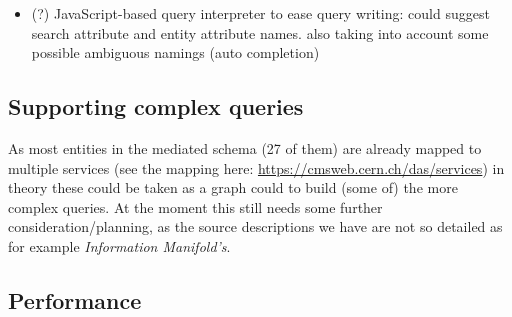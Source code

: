 \begin{itemize}
\begin{itemize}
\item knowing all possible APIs parameter values would be beneficial ({\color{red}but not yet sure if available}%
		\footnote{problem: the owners of services may not want to provide direct access to DB because of no trust, security or performance issues. Otherwise, specific APIs could be developed to return possible parameter values but this is quite an overhead}) and could be used to improve the keyword search (better mapping from keywords to API inputs) or even the structured search (e.g. query cleaning/term auto-completion)
\begin{itemize}
\item having direct access to DB, one could incrementally index target database\footnote{%
			E.g. an inverted index of values in Oracle/MySQL DB tables can be built to keep the list of possible terms. For instance, Sphinx full text search engine can access DBs directly and also supports incremental indexing but it needs a bit of manual configuration {http://sphinxsearch.com/docs/current.html\#delta-updates} }%
	tables mapping it's columns into API parameters (manually or automatically). 

\end{itemize}
	\end{itemize}
\item (?) JavaScript-based query interpreter to ease query writing: could suggest search attribute and entity attribute names. also taking into account some possible ambiguous namings (auto completion)
\end{itemize}


\subsection{Supporting complex queries}
As most entities in the mediated schema (27 of them) are already mapped to multiple services (see the mapping here: \url{https://cmsweb.cern.ch/das/services}) in theory these could be taken as a graph could to build (some of) the more complex queries. {\color{red}At the moment this still needs some further consideration/planning, as the source descriptions we have are not so detailed as for example \textit{Information Manifold's}.}

\subsection{Performance}


